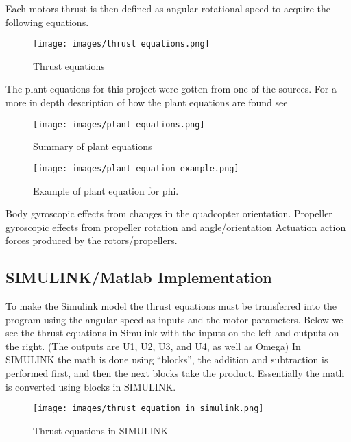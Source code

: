 \documentclass{article}
\begin{document}
Each motors thrust is then defined as angular rotational speed to acquire the following equations.

\begin{figure}[H]
\begin{center}
   \texttt{[image: images/thrust equations.png]}
\end{center}
\caption{Thrust equations \cite{Ferry}}
\end{figure}

The plant equations for this project were gotten from one of the sources. For a more in depth description of how the plant equations are found see \cite{Ferry}
\begin{figure}[H]
\begin{center}
   \texttt{[image: images/plant equations.png]}
\end{center}
\caption{Summary of plant equations \cite{Ferry}}
\end{figure}

\begin{figure}[H]
\begin{center}
   \texttt{[image: images/plant equation example.png]}
\end{center}
\caption{Example of plant equation for phi. \cite{Ferry}}
\end{figure}

Body gyroscopic effects from changes in the quadcopter orientation.
Propeller gyroscopic effects from propeller rotation and angle/orientation
Actuation action forces produced by the rotors/propellers.

\subsection{SIMULINK/Matlab Implementation}
To make the Simulink model the thrust equations must be transferred into the program using the angular speed as inputs and the motor parameters. Below we see the thrust equations in Simulink with the inputs on the left and outputs on the right. (The outputs are U1, U2, U3, and U4, as well as Omega) In SIMULINK the math is done using “blocks”, the addition and subtraction is performed first, and then the next blocks take the product. Essentially the math is converted using blocks in SIMULINK.

\begin{figure}[H]
\begin{center}
   \texttt{[image: images/thrust equation in simulink.png]}
\end{center}
\caption{Thrust equations in SIMULINK}
\end{figure}
\end{document}

